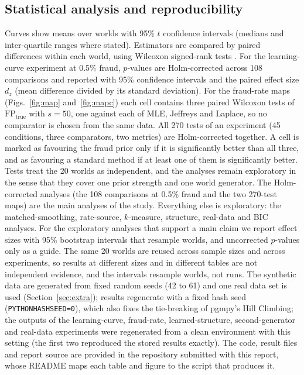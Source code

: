 \documentclass[final,5p,times,authoryear]{elsarticle}
\begin{document}
\subsection{Statistical analysis and reproducibility}
Curves show means over worlds with 95\% $t$ confidence intervals (medians and inter-quartile ranges where stated). Estimators are compared by paired differences within each world, using Wilcoxon signed-rank tests \citep{wilcoxon1945}. For the learning-curve experiment at 0.5\% fraud, $p$-values are Holm-corrected \citep{holm1979} across 108 comparisons and reported with 95\% confidence intervals and the paired effect size $d_z$ (mean difference divided by its standard deviation). For the fraud-rate maps (Figs.~\ref{fig:map} and~\ref{fig:mapc}) each cell contains three paired Wilcoxon tests of $\mathrm{FP}_{\text{true}}$ with $s=50$, one against each of MLE, Jeffreys and Laplace, so no comparator is chosen from the same data. All 270 tests of an experiment (45 conditions, three comparators, two metrics) are Holm-corrected together. A cell is marked as favouring the fraud prior only if it is significantly better than all three, and as favouring a standard method if at least one of them is significantly better. Tests treat the 20 worlds as independent, and the analyses remain exploratory in the sense that they cover one prior strength and one world generator. The Holm-corrected analyses (the 108 comparisons at 0.5\% fraud and the two 270-test maps) are the main analyses of the study. Everything else is exploratory: the matched-smoothing, rate-source, $k$-measure, structure, real-data and BIC analyses. For the exploratory analyses that support a main claim we report effect sizes with 95\% bootstrap intervals that resample worlds, and uncorrected $p$-values only as a guide. The same 20 worlds are reused across sample sizes and across experiments, so results at different sizes and in different tables are not independent evidence, and the intervals resample worlds, not runs. The synthetic data are generated from fixed random seeds (42 to 61) and one real data set is used (Section~\ref{sec:extra}); results regenerate with a fixed hash seed (\texttt{PYTHONHASHSEED=0}), which also fixes the tie-breaking of pgmpy's Hill Climbing; the outputs of the learning-curve, fraud-rate, learned-structure, second-generator and real-data experiments were regenerated from a clean environment with this setting (the first two reproduced the stored results exactly). The code, result files and report source are provided in the repository submitted with this report, whose README maps each table and figure to the script that produces it.
\end{document}
